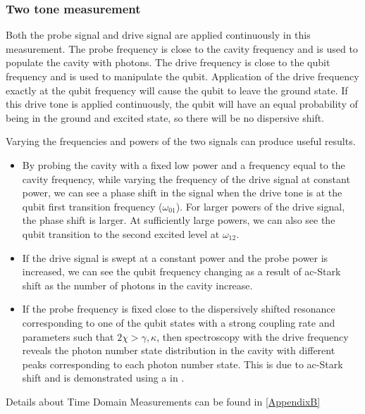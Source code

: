 \subsubsection{Two tone measurement}

Both the probe signal and drive signal are applied continuously in this measurement. The probe frequency is close to the cavity frequency and is used to populate the cavity with photons. The drive frequency is close to the qubit frequency and is used to manipulate the qubit. Application of the drive frequency exactly at the qubit frequency will cause the qubit to leave the ground state. If this drive tone is applied continuously, the qubit will have an equal probability of being in the ground and excited state, so there will be no dispersive shift.

Varying the frequencies and powers of the two signals can produce useful results.
\begin{itemize}
\item By probing the cavity with a fixed low power and a frequency equal to the cavity frequency, while varying the frequency of the drive signal at constant power, we can see a phase shift in the signal when the drive tone is at the qubit first transition frequency ($\omega_{01}$). For larger powers of the drive signal, the phase shift is larger. At sufficiently large powers, we can also see the qubit transition to the second excited level at $\omega_{12}$.
\item If the drive signal is swept at a constant power and the probe power is increased, we can see the qubit frequency changing as a result of ac-Stark shift as the number of photons in the cavity increase.
\item If the probe frequency is fixed close to the dispersively shifted resonance corresponding to one of the qubit states with a strong coupling rate and parameters such that $2\chi>\gamma,\kappa$, then spectroscopy with the drive frequency reveals the photon number state distribution in the cavity with different peaks corresponding to each photon number state. This is due to ac-Stark shift and is demonstrated using a \CPB in \cite{Schuster2007a}.
\end{itemize}

Details about Time Domain Measurements can be found in \ref{AppendixB}